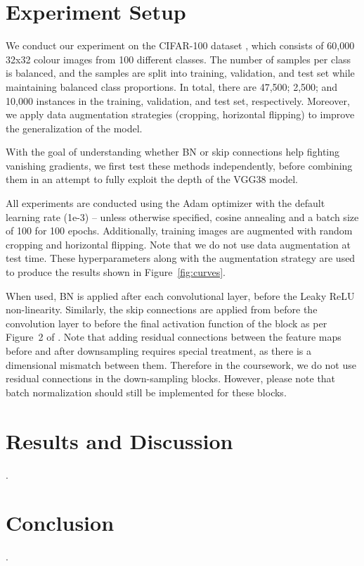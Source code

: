 \documentclass{article}
\begin{document}
\section{Experiment Setup}

\questionFigureFour

\questionFigureFive

\questionTableOne

We conduct our experiment on the CIFAR-100 dataset \cite{krizhevsky2009learning},
which consists of 60,000 32x32 colour images from
100 different classes. The number of samples per class is balanced, and the
samples are split into training, validation, and test set while
maintaining balanced class proportions. In total, there are
47,500; 2,500; and 10,000 instances in the training, validation,
and test set, respectively. Moreover, we apply data
augmentation strategies (cropping, horizontal flipping) to
improve the generalization of the model.

With the goal of understanding whether BN or skip connections
help fighting vanishing gradients, we first test these
methods independently, before combining them in an attempt
to fully exploit the depth of the VGG38 model.

All experiments are conducted using the Adam optimizer with the default
learning rate (1e-3) -- unless otherwise specified, cosine annealing and a batch size of 100
for 100 epochs. 
Additionally, training images are augmented with random 
cropping and horizontal flipping.
Note that we do not use data augmentation at test time.
These hyperparameters along with the augmentation strategy are used
to produce the results shown in Figure~\ref{fig:curves}.

When used, BN is applied
after each convolutional layer, before the Leaky
ReLU non-linearity. 
Similarly, the skip connections are applied from 
before the convolution layer to before the final activation function
of the block as per Figure~2 of \cite{he2016deep}. 
Note that adding residual connections between the feature maps before and after downsampling requires special treatment, as there is a dimensional mismatch between them. 
Therefore in the coursework, we do not use residual connections in the down-sampling blocks. However, please note that batch normalization should still be implemented for these blocks. 
\section{Results and Discussion}
\label{sec:disc}

\questionFour.

\section{Conclusion}
\label{sec:concl}
    
\questionFive.


\end{document}

